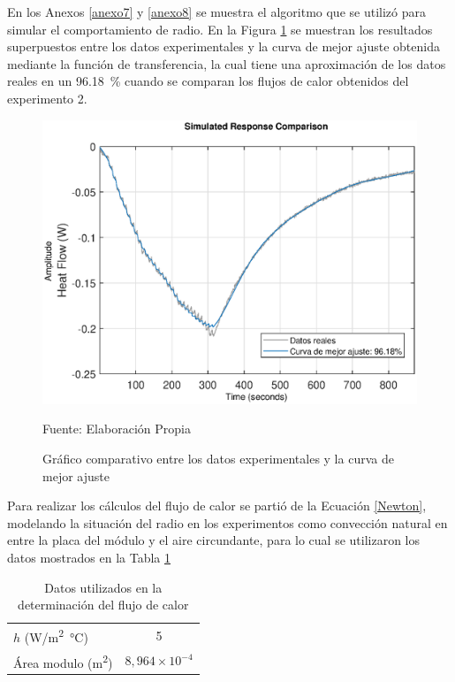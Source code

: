 En los Anexos \ref{anexo7} y \ref{anexo8} se muestra el algoritmo que se utilizó para simular el comportamiento de radio. En la Figura \ref{fit} se muestran los resultados superpuestos entre los datos experimentales y la curva de mejor ajuste obtenida mediante la función de transferencia, la cual tiene una aproximación de los datos reales en un \SI{96,18}{\percent} cuando se comparan los flujos de calor obtenidos del experimento 2.

\begin{figure}[H]
\centering
\includegraphics[scale=0.70]{Figuras/Fit.eps}
\caption{Gráfico comparativo entre los datos experimentales y la curva de mejor ajuste}
Fuente: Elaboración Propia
\label{fit}
\end{figure}

Para realizar los cálculos del flujo de calor se partió de la Ecuación \ref{Newton}, modelando la situación del radio en los experimentos como convección natural en entre la placa del módulo y el aire circundante, para lo cual se utilizaron los datos mostrados en la Tabla \ref{datosflujo}

\begin{table}[H]
\centering
\caption{Datos utilizados en la determinación del flujo de calor}
\label{datosflujo}
\begin{tabular}{lc}
\toprule
$h$ (\si{\watt/\meter\squared\celsius}) & 5 \\ %
Área modulo (\si{\meter\squared}) & $8,964\times 10^{-4}$ \\ \bottomrule
\end{tabular}
\end{table}


